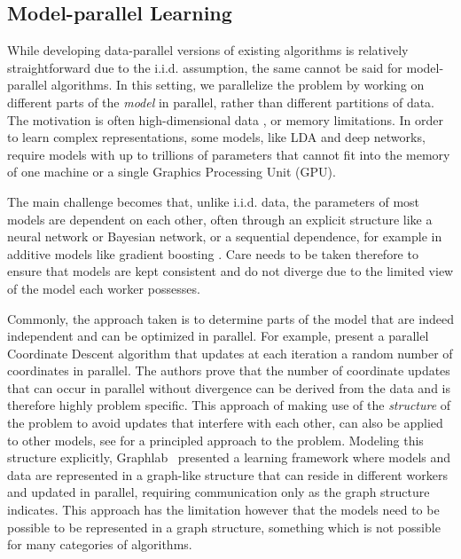 \subsection*{Model-parallel Learning}

While developing data-parallel versions of existing algorithms is relatively straightforward
due to the i.i.d. assumption, the same cannot be said for model-parallel algorithms. In this
setting, we parallelize the problem by working on different parts of the \emph{model}
in parallel, rather than different partitions of data. The motivation is often
high-dimensional data \cite{parallel-cd-l1}, or
memory limitations. In order to learn complex representations, some models, like LDA and deep networks, require
models with up to trillions of parameters \cite{lightLDA, large-scale-dl}
that cannot fit into the memory of one machine or a single Graphics Processing Unit (GPU).

The main challenge becomes
that, unlike i.i.d. data, the parameters of most models are dependent on each
other, often through an explicit structure like a neural network or Bayesian network, or a
sequential dependence, for example in additive models like gradient boosting \cite{esl}.
Care needs to be taken therefore to ensure that models are kept consistent and do not
diverge due to the limited view of the model each worker possesses.

Commonly, the approach taken is to determine parts of the model that are indeed
independent and can be optimized in parallel. For example, \citet{parallel-cd-l1}
present a parallel Coordinate Descent algorithm that updates at each iteration
a random number of coordinates in parallel. The authors prove that the number of coordinate updates
that can occur in parallel without divergence can be derived from the data and is therefore
highly problem specific. This approach of making use of the \emph{structure} of
the problem to avoid updates that interfere with each other, can also be applied
to other models, see \citet{model-parallel-learning} for a principled approach
to the problem.
Modeling this structure explicitly, Graphlab~\cite{graphlab, graphlab-distributed} presented a learning framework
where models and data are represented in a graph-like structure that can reside in different
workers and updated in parallel, requiring communication only as the graph structure
indicates. This approach has the limitation however that the models need to be
possible to be represented in a graph structure, something which is not possible
for many categories of algorithms.

